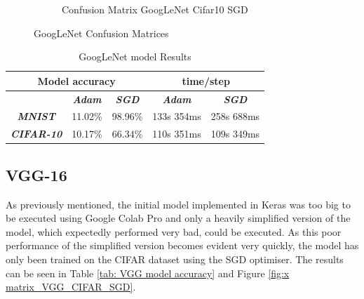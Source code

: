 \documentclass[conference]{IEEEtran}
\begin{document}
\begin{figure}[!htbp]
\begin{subfigure}[b]{0.22\textwidth}
        \caption{Confusion Matrix GoogLeNet Cifar10 SGD}
        \label{fig:x matrix_GoogLeNet_CIFAR_SGD}
    \end{subfigure}
    \caption{GoogLeNet Confusion Matrices}
    \label{fig:GoogLeNet Confusion Matrixis}
\end{figure}

\begin{table}[!htbp]
    \caption{GoogLeNet model Results}
    \begin{center}
    \begin{tabular}{|c|c|c|c|c|}
    \cline{1-5} 
    \multicolumn{3}{|c|}{\textbf{Model accuracy}} & \multicolumn{2}{|c|}{\textbf{time/step}} \\
    \hline 
    \textit{} & \textbf{\textit{Adam}} & \textbf{\textit{SGD}} & \textbf{\textit{Adam}} & \textbf{\textit{SGD}} \\
    \hline
    \textbf{\textit{MNIST}} & 11.02\% & 98.96\% & 133s 354ms & 258s 688ms \\
    \hline
    \textbf{\textit{CIFAR-10}} & 10.17\% & 66.34\% & 110s 351ms & 109s 349ms \\
    \cline{1-5} 
    \end{tabular}
    \label{tab: GoogLeNet model accuracy}
    \end{center}
\end{table}

\subsection{VGG-16}
As previously mentioned, the initial model implemented in Keras was too big to be executed using Google Colab Pro and only a heavily simplified version of the model, which expectedly performed very bad, could be executed.
As this poor performance of the simplified version becomes evident very quickly, the model has only been trained on the CIFAR dataset using the SGD optimiser. The results can be seen in Table \ref{tab: VGG model accuracy} and Figure \ref{fig:x matrix_VGG_CIFAR_SGD}.
\end{document}
